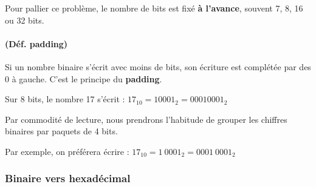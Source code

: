 \documentclass[a4paper,17pt]{extarticle}
\begin{document}
Pour pallier ce problème, le nombre de bits est fixé \textbf{à
l'avance}, souvent 7, 8, 16 ou 32 bits.
\begin{retenir}
    \hypertarget{duxe9f.-padding}{%
\paragraph{(Déf. padding)}\label{duxe9f.-padding}}

Si un nombre binaire s'écrit avec moins de bits, son écriture est
complétée par des 0 à gauche. C'est le principe du \textbf{padding}.

        \end{retenir}\begin{exemple}
    Sur 8 bits, le nombre 17 s'écrit : \(17_{10} = 10001_2 = 00010001_2\)

        \end{exemple}\begin{remarque}
    Par commodité de lecture, nous prendrons l'habitude de grouper les
chiffres binaires par paquets de 4 bits.

Par exemple, on préférera écrire : \(17_{10} = 1~0001_2 = 0001~0001_2\)

        \end{remarque}
    \hypertarget{binaire-vers-hexaduxe9cimal}{%
\subsubsection{Binaire vers
hexadécimal}\label{binaire-vers-hexaduxe9cimal}}
\end{document}
